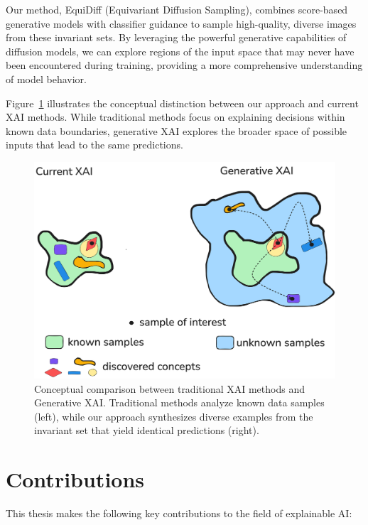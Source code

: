 \documentclass[licencjacka,en]{pracamgr}
\newcommand{\method}[1]{EquiDiff}  %
\begin{document}
Our method, \method{} (Equivariant Diffusion Sampling), combines score-based generative models with classifier guidance to sample high-quality, diverse images from these invariant sets. By leveraging the powerful generative capabilities of diffusion models, we can explore regions of the input space that may never have been encountered during training, providing a more comprehensive understanding of model behavior.

Figure~\ref{fig:1_teaser} illustrates the conceptual distinction between our approach and current XAI methods. While traditional methods focus on explaining decisions within known data boundaries, generative XAI explores the broader space of possible inputs that lead to the same predictions.

\begin{figure}[h]
\centering
\includegraphics[width=0.8\linewidth]{figures/main/teaser1.png}
\caption{Conceptual comparison between traditional XAI methods and Generative XAI. Traditional methods analyze known data samples (left), while our approach synthesizes diverse examples from the invariant set that yield identical predictions (right).}
\label{fig:1_teaser}
\end{figure}

\section{Contributions}

This thesis makes the following key contributions to the field of explainable AI:
\end{document}
